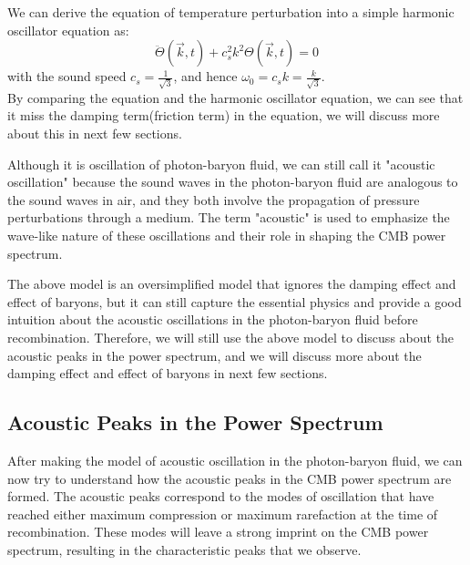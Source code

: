 \bigskip \noindent
\begin{theory}
    We can derive the equation of temperature perturbation into a simple harmonic oscillator equation as:
    \[
        \ddot{\Theta}(\vec{k},t) + c_s^2 k^2 \Theta(\vec{k},t) = 0
    \]
    with the sound speed $c_s = \frac{1}{\sqrt{3}}$, and hence $\omega_0 = c_s k = \frac{k}{\sqrt{3}}$. \\

    By comparing the equation and the harmonic oscillator equation, we can see that it miss the damping term(friction term) in the equation, we will discuss more about this in next few sections.
\end{theory}

\bigskip \noindent
\begin{remark}
    Although it is oscillation of photon-baryon fluid, we can still call it "acoustic oscillation" because the sound waves in the photon-baryon fluid are analogous to the sound waves in air, and they both involve the propagation of pressure perturbations through a medium. The term "acoustic" is used to emphasize the wave-like nature of these oscillations and their role in shaping the CMB power spectrum.
\end{remark}

\bigskip \noindent
\begin{importantnote}
    The above model is an oversimplified model that ignores the damping effect and effect of baryons, but it can still capture the essential physics and provide a good intuition about the acoustic oscillations in the photon-baryon fluid before recombination. Therefore, we will still use the above model to discuss about the acoustic peaks in the power spectrum, and we will discuss more about the damping effect and effect of baryons in next few sections.
\end{importantnote}



\bigskip \noindent \bigskip \noindent \bigskip \noindent
\subsection{Acoustic Peaks in the Power Spectrum}
\begin{intuition}
    After making the model of acoustic oscillation in the photon-baryon fluid, we can now try to understand how the acoustic peaks in the CMB power spectrum are formed. The acoustic peaks correspond to the modes of oscillation that have reached either maximum compression or maximum rarefaction at the time of recombination. These modes will leave a strong imprint on the CMB power spectrum, resulting in the characteristic peaks that we observe. \\
\end{intuition}

